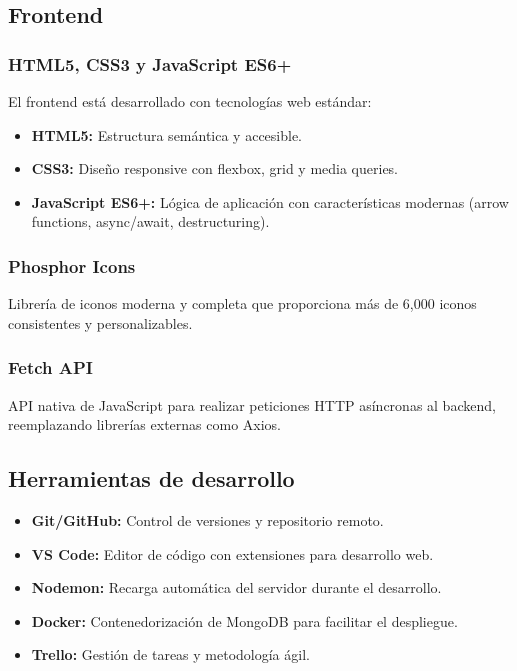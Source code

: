 \documentclass[12pt,a4paper]{article}
\begin{document}
\subsection{Frontend}

\subsubsection{HTML5, CSS3 y JavaScript ES6+}

El frontend está desarrollado con tecnologías web estándar:

\begin{itemize}
    \item \textbf{HTML5:} Estructura semántica y accesible.
    \item \textbf{CSS3:} Diseño responsive con flexbox, grid y media queries.
    \item \textbf{JavaScript ES6+:} Lógica de aplicación con características modernas (arrow functions, async/await, destructuring).
\end{itemize}

\subsubsection{Phosphor Icons}

Librería de iconos moderna y completa que proporciona más de 6,000 iconos consistentes y personalizables.

\subsubsection{Fetch API}

API nativa de JavaScript para realizar peticiones HTTP asíncronas al backend, reemplazando librerías externas como Axios.

\subsection{Herramientas de desarrollo}

\begin{itemize}
    \item \textbf{Git/GitHub:} Control de versiones y repositorio remoto.
    \item \textbf{VS Code:} Editor de código con extensiones para desarrollo web.
    \item \textbf{Nodemon:} Recarga automática del servidor durante el desarrollo.
    \item \textbf{Docker:} Contenedorización de MongoDB para facilitar el despliegue.
    \item \textbf{Trello:} Gestión de tareas y metodología ágil.
\end{itemize}
\end{document}

